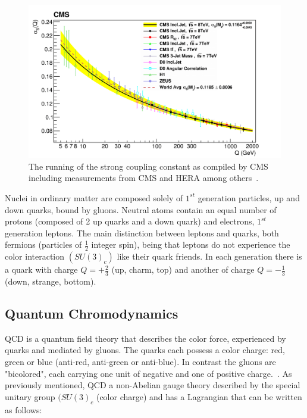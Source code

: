 \begin{figure}[htb]
\centering
\includegraphics[width=.70\textwidth]{visuals/strong-coupling-cms2.png}
\caption{The running of the strong coupling constant as compiled by CMS including measurements from CMS and HERA among others~\cite{CMS:2014mna}.}
\label{fig:alphas}
\end{figure}












Nuclei in ordinary matter are composed solely of $1^{st}$ generation particles, up and down quarks, bound by gluons. Neutral atoms contain an equal number of protons (composed of 2 up quarks and a down quark) and electrons, $1^{st}$ generation leptons. The main distinction between leptons and quarks, both fermions (particles of $\frac{1}{2}$ integer spin), being that leptons do not experience the color interaction $(SU(3)_c)$ like their quark friends. In each generation there is a quark with charge $Q = + \frac{2}{3}$ (up, charm, top) and another of charge $Q = - \frac{1}{3}$ (down, strange, bottom).





\subsection{Quantum Chromodynamics}\label{secQCD}


QCD is a quantum field theory that describes the color force, experienced by quarks and mediated by gluons. The quarks each possess a color charge: red, green or blue (anti-red, anti-green or anti-blue). In contrast the gluons are "bicolored", each carrying one unit of negative and one of positive charge.~\cite{Griffiths:111880}. As previously mentioned, QCD a non-Abelian gauge theory described by the special unitary group $(SU(3)_c$ (color charge) and has a Lagrangian that can be written as follows:\newline


